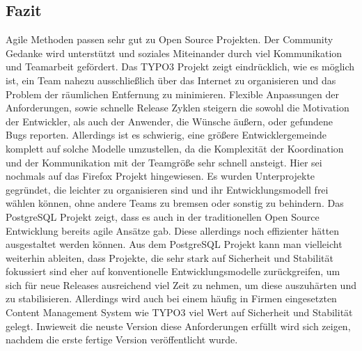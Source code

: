   \subsection{Fazit}
  Agile Methoden passen sehr gut zu Open Source Projekten. Der Community Gedanke wird unterstützt und soziales Miteinander durch viel Kommunikation und Teamarbeit gefördert. Das TYPO3 Projekt zeigt eindrücklich, wie es möglich ist, ein Team nahezu ausschließlich über das Internet zu organisieren und das Problem der räumlichen Entfernung zu minimieren. Flexible Anpassungen der Anforderungen, sowie schnelle Release Zyklen steigern die sowohl die Motivation der Entwickler, als auch der Anwender, die Wünsche äußern, oder gefundene Bugs reporten. Allerdings ist es schwierig, eine größere Entwicklergemeinde komplett auf solche Modelle umzustellen, da die Komplexität der Koordination und der Kommunikation mit der Teamgröße sehr schnell ansteigt. Hier sei nochmals auf das Firefox Projekt hingewiesen. Es wurden Unterprojekte gegründet, die leichter zu organisieren sind und ihr Entwicklungsmodell frei wählen können, ohne andere Teams zu bremsen oder sonstig zu behindern. Das PostgreSQL Projekt zeigt, dass es auch in der traditionellen Open Source Entwicklung bereits agile Ansätze gab. Diese allerdings noch effizienter hätten ausgestaltet werden können. Aus dem PostgreSQL Projekt kann man vielleicht weiterhin ableiten, dass Projekte, die sehr stark auf Sicherheit und Stabilität fokussiert sind eher auf konventionelle Entwicklungsmodelle zurückgreifen, um sich für neue Releases ausreichend viel Zeit zu nehmen, um diese auszuhärten und zu stabilisieren. Allerdings wird auch bei einem häufig in Firmen eingesetzten Content Management System wie TYPO3 viel Wert auf Sicherheit und Stabilität gelegt. Inwieweit die neuste Version diese Anforderungen erfüllt wird sich zeigen, nachdem die erste fertige Version veröffentlicht wurde.


